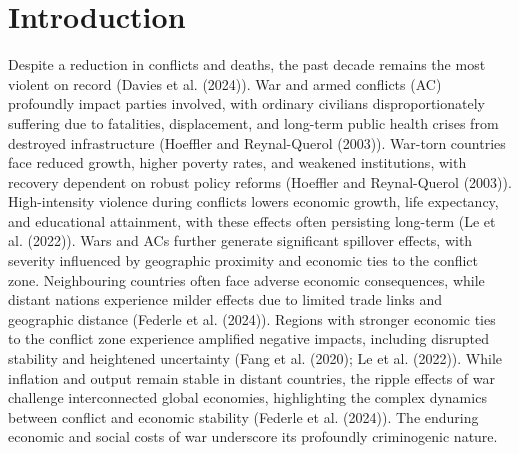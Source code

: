 \documentclass[
]{article}
\begin{document}
\newpage

\section{Introduction}\label{introduction}

Despite a reduction in conflicts and deaths, the past decade remains the
most violent on record (Davies et al. (2024)). War and armed conflicts
(AC) profoundly impact parties involved, with ordinary civilians
disproportionately suffering due to fatalities, displacement, and
long-term public health crises from destroyed infrastructure (Hoeffler
and Reynal-Querol (2003)). War-torn countries face reduced growth,
higher poverty rates, and weakened institutions, with recovery dependent
on robust policy reforms (Hoeffler and Reynal-Querol (2003)).
High-intensity violence during conflicts lowers economic growth, life
expectancy, and educational attainment, with these effects often
persisting long-term (Le et al. (2022)). Wars and ACs further generate
significant spillover effects, with severity influenced by geographic
proximity and economic ties to the conflict zone. Neighbouring countries
often face adverse economic consequences, while distant nations
experience milder effects due to limited trade links and geographic
distance (Federle et al. (2024)). Regions with stronger economic ties to
the conflict zone experience amplified negative impacts, including
disrupted stability and heightened uncertainty (Fang et al. (2020); Le
et al. (2022)). While inflation and output remain stable in distant
countries, the ripple effects of war challenge interconnected global
economies, highlighting the complex dynamics between conflict and
economic stability (Federle et al. (2024)). The enduring economic and
social costs of war underscore its profoundly criminogenic nature.
\end{document}
